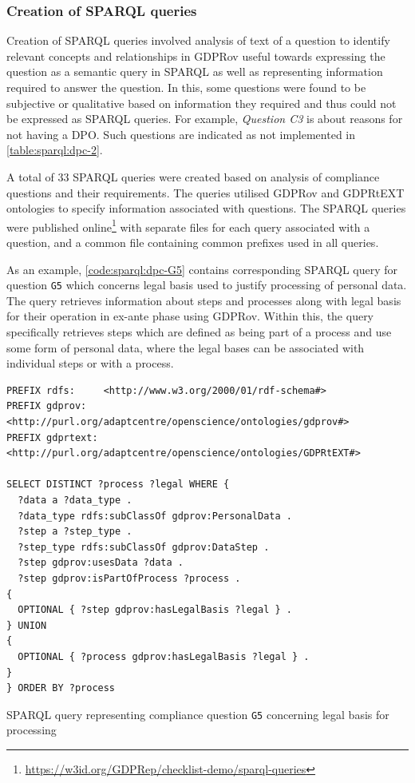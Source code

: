 \subsubsection{Creation of SPARQL queries}
Creation of SPARQL queries involved analysis of text of a question to identify relevant concepts and relationships in GDPRov useful towards expressing the question as a semantic query in SPARQL as well as representing information required to answer the question.
In this, some questions were found to be subjective or qualitative based on information they required and thus could not be expressed as SPARQL queries. For example, \textit{Question C3} is about reasons for not having a DPO. Such questions are indicated as not implemented in \autoref{table:sparql:dpc-2}.

A total of 33 SPARQL queries were created based on analysis of compliance questions and their requirements.
The queries utilised GDPRov and GDPRtEXT ontologies to specify information associated with questions.
The SPARQL queries were published online\footnote{\url{https://w3id.org/GDPRep/checklist-demo/sparql-queries}}
with separate files for each query associated with a question, and a common file containing common prefixes used in all queries.

As an example, \autoref{code:sparql:dpc-G5} contains corresponding SPARQL query for question \texttt{G5} which concerns legal basis used to justify processing of personal data. 
The query retrieves information about steps and processes along with legal basis for their operation in ex-ante phase using GDPRov.
Within this, the query specifically retrieves steps which are defined as being part of a process and use some form of personal data, where the legal bases can be associated with individual steps or with a process.
\begin{listing}[htbp]
\begin{verbatim}
PREFIX rdfs:     <http://www.w3.org/2000/01/rdf-schema#>
PREFIX gdprov:   <http://purl.org/adaptcentre/openscience/ontologies/gdprov#>
PREFIX gdprtext: <http://purl.org/adaptcentre/openscience/ontologies/GDPRtEXT#>

SELECT DISTINCT ?process ?legal WHERE {
  ?data a ?data_type .
  ?data_type rdfs:subClassOf gdprov:PersonalData .
  ?step a ?step_type .
  ?step_type rdfs:subClassOf gdprov:DataStep .
  ?step gdprov:usesData ?data . 
  ?step gdprov:isPartOfProcess ?process .
{
  OPTIONAL { ?step gdprov:hasLegalBasis ?legal } .
} UNION
{
  OPTIONAL { ?process gdprov:hasLegalBasis ?legal } .
}
} ORDER BY ?process
\end{verbatim}
\caption{SPARQL query representing compliance question \texttt{G5} concerning legal basis for processing}
\label{code:sparql:dpc-G5}
\end{listing}

